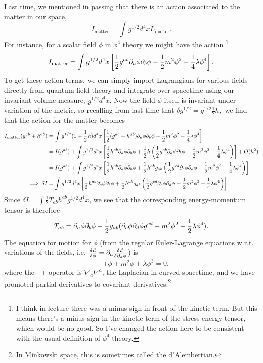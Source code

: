 Last time, we mentioned in passing that there is an action associated to the matter in our space,
\begin{equation}
    I_\text{matter}=\int g^{1/2} d^4x L_\text{matter}.
\end{equation}
For instance, for a scalar field $\phi$ in $\phi^4$ theory we might have the action%
    \footnote{I think in lecture there was a minus sign in front of the kinetic term. But this means there's a minus sign in the kinetic term of the stress-energy tensor, which would be no good. So I've changed the action here to be consistent with the usual definition of $\phi^4$ theory.}
\begin{equation}
    I_\text{matter}=\int g^{1/2} d^4x \left[\frac{1}{2}g^{ab}\partial_a \phi \partial_b \phi -\frac{1}{2}m^2\phi^2-\frac{1}{4} \lambda \phi^4\right].
\end{equation}
To get these action terms, we can simply import Lagrangians for various fields directly from quantum field theory and integrate over spacetime using our invariant volume measure, $g^{1/2}d^4x$. Now the field $\phi$ itself is invariant under variation of the metric, so recalling from last time that $\delta g^{1/2}=g^{1/2}\frac{1}{2}h,$ we find that the action for the matter becomes
\begin{align*}
    I_\text{matter}(g^{ab}+h^{ab})&= \int g^{1/2}(1+\frac{1}{2}h) d^4x \left[\frac{1}{2}(g^{ab}+h^{ab})\partial_a \phi \partial_b \phi -\frac{1}{2}m^2\phi^2-\frac{1}{4} \lambda \phi^4\right]\\
    &=I(g^{ab})+\int g^{1/2} d^4x \left[\frac{1}{2} h^{ab} \partial_a \phi\partial_b \phi+\frac{1}{2}h\left(\frac{1}{2}g^{ab}\partial_a \phi \partial_b \phi -\frac{1}{2}m^2\phi^2-\frac{1}{4} \lambda \phi^4\right)\right]+O(h^2)\\
    &=I(g^{ab})+\int g^{1/2} d^4x \left[\frac{1}{2} h^{ab} \partial_a \phi\partial_b \phi+\frac{1}{2}h^{ab}g_{ab}\left(\frac{1}{2}g^{cd}\partial_c \phi \partial_d \phi -\frac{1}{2}m^2\phi^2-\frac{1}{4} \lambda \phi^4\right)\right]\\
    \implies \delta I &=\int g^{1/2} d^4x \left[\frac{1}{2} h^{ab}\partial_a \phi \partial_b \phi +\frac{1}{2} h^{ab}g_{ab}\left(\frac{1}{2} g^{cd} \partial_c \phi \partial_d \phi -\frac{1}{2} m^2 \phi^2 -\frac{1}{4} \lambda \phi^4\right)\right]
\end{align*}
Since $\delta I= \int \frac{1}{2} T_{ab} h^{ab} g^{1/2} d^4x$, we see that the corresponding energy-momentum tensor is therefore
$$T_{ab}=\partial_a \phi \partial_b \phi +\frac{1}{2} g_{ab}(\partial_c \phi \partial_d \phi g^{cd} -m^2\phi^2 -\frac{1}{2} \lambda \phi^4).$$
The equation for motion for $\phi$ (from the regular Euler-Lagrange equations w.r.t. variations of the fields, i.e. $\frac{\delta \mathcal L}{\delta \phi}=\partial_a \frac{\delta \mathcal L}{\delta \partial_a \phi}$) is
$$-\Box \phi+ m^2\phi +\lambda \phi^3 =0,$$
where the $\Box$ operator is $\nabla_a \nabla^a$, the Laplacian in curved spacetime, and we have promoted partial derivatives to covariant derivatives.\footnote{In Minkowski space, this is sometimes called the d'Alembertian.}

